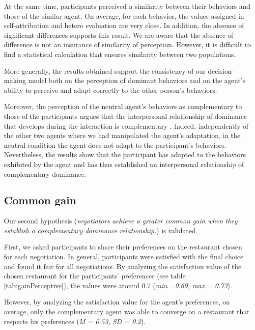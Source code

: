 \documentclass[10pt, a4paper, twocolumn]{article} %
\begin{document}
At the same time, participants perceived a similarity between their behaviors and those of the similar agent. On average, for each behavior, the values assigned in self-attribution and hetero evaluation are very close. In addition, the absence of significant differences supports this result. We are aware that the absence of difference is not an insurance of similarity of perception. However, it is difficult to find a statistical calculation that ensures similarity between two populations.

More generally, the results obtained support the consistency of our decision-making model both on the perception of dominant behaviors and on the agent's ability to perceive and adapt correctly to the other person's behaviors.  

Moreover, the perception of the neutral agent's behaviors as complementary to those of the participants argues that the interpersonal relationship of dominance that develops during the interaction is complementary \cite{burgoonnonverbal}. Indeed, independently of the other two agents where we had manipulated the agent's adaptation, in the neutral condition the agent does not adapt to the participant's behaviors. Nevertheless, the results show that the participant has adapted to the behaviors exhibited by the agent and has thus established an interpersonal relationship of complementary dominance.

\subsection{Common gain}
Our second hypothesis (\textit{negotiators achieve a greater common gain when they establish a complementary dominance relationship.}) is validated. 

First, we asked participants to share their preferences on the restaurant chosen for each negotiation.
In general, participants were satisfied with the final choice and found it fair for all negotiations. 
By analyzing the satisfaction value of the chosen restaurant for the participants' preferences (see table \ref{tab:gainPerceptive}), the values were around 0.7 (\emph{min =0.69, max = 0.73}). 

However, by analyzing the satisfaction value for the agent's preferences, on average, only the complementary agent was able to converge on a restaurant that respects his preferences (\emph{M = 0.53, SD = 0.2}). 
\end{document}
